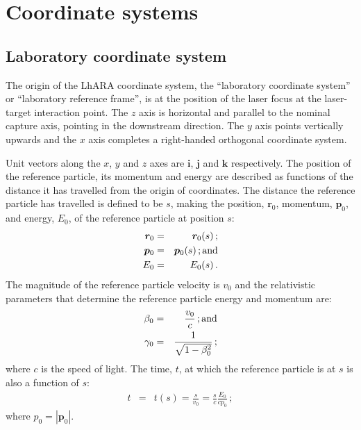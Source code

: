 \graphicspath{ {02-CoordinateSystems/Figures/} }

\section{Coordinate systems}

\subsection{Laboratory coordinate system}

The origin of the LhARA coordinate system, the ``laboratory coordinate
system'' or ``laboratory reference frame'', is at the position of the
laser focus at the laser-target interaction point.
The $z$ axis is horizontal and parallel to the nominal capture axis,
pointing in the downstream direction.
The $y$ axis points vertically upwards and the $x$ axis completes a
right-handed orthogonal coordinate system. 

Unit vectors along the $x$, $y$ and $z$ axes are $\bm{i}$, $\bm{j}$
and $\bm{k}$ respectively.
The position of the reference particle, its momentum and energy are
described as functions of the distance it has travelled from the origin
of coordinates.
The distance the reference particle has travelled is defined to be
$s$, making the position, $\bm{r}_0$, momentum, $\bm{p}_0$, and
energy, $E_0$, of the reference particle at position $s$:
\begin{eqnarray}
  \bm{r}_0 & = & \bm{r}_0(s)\, ;           \nonumber \\
  \bm{p}_0 & = & \bm{p}_0(s)\, {\rm ; and}           \\
       E_0 & = &      E_0(s)\, .           \nonumber
\end{eqnarray}
The magnitude of the reference particle velocity is $v_0$ and the
relativistic parameters that determine the reference particle energy
and momentum are:
\begin{eqnarray}
  \beta_0  & = & \frac{v_0}{c}                  \, {\rm ; and} \nonumber \\
  \gamma_0 & = & \frac{1}{\sqrt{1 - \beta^2_0}} \,; \nonumber
\end{eqnarray}
where $c$ is the speed of light.
The time, $t$, at which the reference particle is at $s$ is also a
function of $s$:
\begin{eqnarray}
        t  & = & t(s) = \frac{s}{v_0} = \frac{s}{c} \frac{E_0}{c p_0}\, ;
\end{eqnarray}
where $p_0=\left|\bm{p}_0\right|$.

